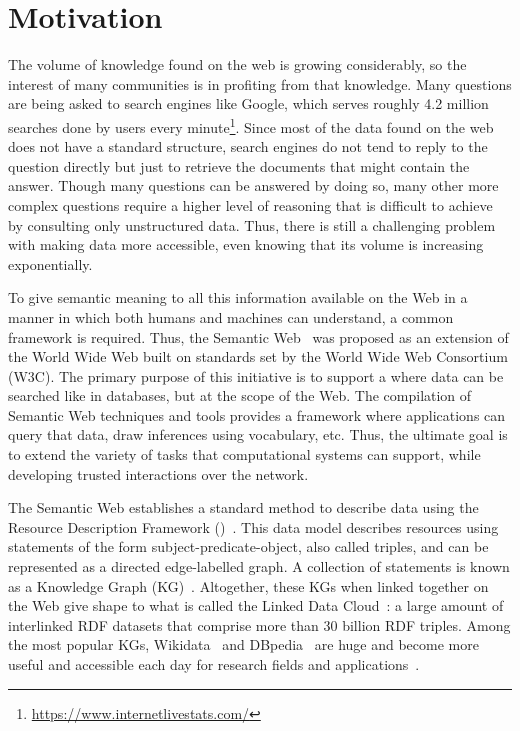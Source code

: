 \section{Motivation}
The volume of knowledge found on the web is growing considerably, so the interest of many 
communities is in profiting from that knowledge. Many questions are being asked  
to search engines like Google, which serves roughly 4.2 million searches done by users every 
minute\footnote{\href{https://www.internetlivestats.com/}{https://www.internetlivestats.com/}}. 
Since most of the data found on the web does not have a standard structure, 
search engines do not tend to reply to the question directly but just to retrieve the documents 
that might contain the answer. Though many questions can be answered by doing so, many 
other more complex questions require a higher level of reasoning that is difficult to achieve 
by consulting only unstructured data. Thus, there is still a challenging problem with making 
data more accessible, even knowing that its volume is increasing exponentially.

To give semantic meaning to all this information available on the Web in a manner in which both 
humans and machines can understand, a common framework is required. Thus, 
the Semantic Web~\cite{key:semwebsa} was proposed as an extension of the World Wide Web built on 
standards set by the World Wide Web Consortium (W3C). The primary purpose of this 
initiative is to support a  where data can be searched like in databases, but 
at the scope of the Web. The compilation of Semantic Web techniques and tools provides 
a framework where applications can query that data, draw inferences using vocabulary, etc. 
Thus, the ultimate goal is to extend the variety of tasks that computational systems can 
support, while developing trusted interactions over the network. 

The Semantic Web establishes a standard method to describe data using the Resource 
Description Framework (\RDF)~\cite{key:rdfprimer11}. This data model describes resources using 
statements of the form subject-predicate-object, also called triples, and can be represented as a 
directed edge-labelled graph. A collection of \RDF{} statements is known as a Knowledge Graph 
(KG)~\cite{key:ldbook}. Altogether, these KGs when linked together on the Web give shape to what is 
called the Linked Data Cloud~\cite{key:ldprinciples}: a large amount of interlinked RDF datasets that 
comprise more than 30 billion RDF triples. Among the most popular KGs, Wikidata~\cite{KG:wikidata} and 
DBpedia~\cite{KG:dbpedia} are huge and become more useful and accessible each day for research fields 
and applications~\cite{wikidata:usage-MalyshevKGGB18, EL:dbpedia-spotlight-MendesJGB11}. 

